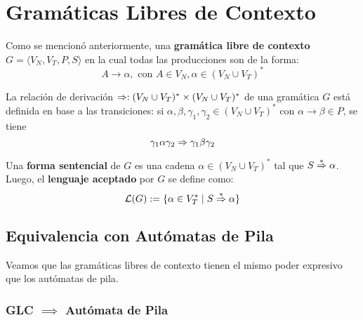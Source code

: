 \section{Gramáticas Libres de Contexto}

Como se mencionó anteriormente, una \textbf{gramática libre de contexto} $G = \langle V_N, V_T, P, S \rangle$ en la cual todas las producciones son de la forma:
$$
    A \to \alpha, \text{ con } A \in V_N, \alpha \in (V_N \cup V_T)^*
$$

La relación de derivación $\Rightarrow: (V_N \cup V_T)^* \times (V_N \cup V_T)^*$ de una gramática $G$ está definida en base a las transiciones: si $\alpha, \beta, \gamma_1, \gamma_2 \in (V_N \cup V_T)^*$ con $\alpha \to \beta \in P$, se tiene
$$
    \gamma_1 \alpha \gamma_2 \Rightarrow \gamma_1 \beta \gamma_2
$$

Una \textbf{forma sentencial} de $G$ es una cadena $\alpha \in (V_N \cup V_T)^*$ tal que $S \overset{*}{\Rightarrow} \alpha$. Luego, el \textbf{lenguaje aceptado} por $G$ se define como:
$$
    \mathcal{L}(G) := \{\alpha \in V_T^* \mid S \overset{*}{\Rightarrow} \alpha\}
$$

\subsection{Equivalencia con Autómatas de Pila}

Veamos que las gramáticas libres de contexto tienen el mismo poder expresivo que los autómatas de pila.

\subsubsection{GLC $\implies$ Autómata de Pila}

